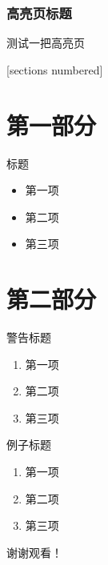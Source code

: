 \documentclass[wide]{styles/cuzbeamer}
\begin{document}
    
    \maketitle

    \begin{frame}[standout]
        \frametitle{高亮页标题}
        测试一把高亮页
    \end{frame}

    \begin{frame}
        [sections numbered]
        \tableofcontents
    \end{frame}

    \section{第一部分}

    \begin{frame}
        \begin{block}{标题}
            \begin{itemize}
                \item 第一项
                \item 第二项
                \item 第三项
            \end{itemize}
        \end{block}
    \end{frame}

    \section{第二部分}

    \begin{frame}
        \begin{alertblock}{警告标题}
            \begin{enumerate}
                \item 第一项
                \item 第二项
                \item 第三项
            \end{enumerate}
        \end{alertblock}
    \end{frame}

    \begin{frame}
        \begin{exampleblock}{例子标题}
            \begin{enumerate}
                \item 第一项
                \item 第二项
                \item 第三项
            \end{enumerate}
        \end{exampleblock}
    \end{frame}

    \begin{frame}[standout]
        谢谢观看！
    \end{frame}
\end{document}
